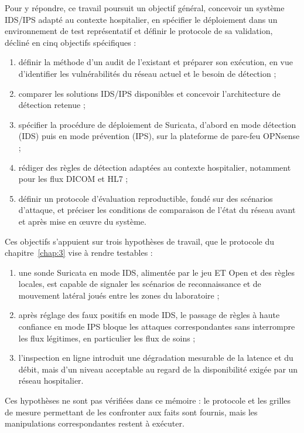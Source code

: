 Pour y répondre, ce travail poursuit un objectif général, concevoir un système IDS/IPS adapté au contexte hospitalier, en spécifier le déploiement dans un environnement de test représentatif et définir le protocole de sa validation, décliné en cinq objectifs spécifiques :
\begin{enumerate}
\item définir la méthode d'un audit de l'existant et préparer son exécution, en vue d'identifier les vulnérabilités du réseau actuel et le besoin de détection ;
\item comparer les solutions IDS/IPS disponibles et concevoir l'architecture de détection retenue ;
\item spécifier la procédure de déploiement de Suricata, d'abord en mode détection (IDS) puis en mode prévention (IPS), sur la plateforme de pare-feu OPNsense ;
\item rédiger des règles de détection adaptées au contexte hospitalier, notamment pour les flux DICOM et HL7 ;
\item définir un protocole d'évaluation reproductible, fondé sur des scénarios d'attaque, et préciser les conditions de comparaison de l'état du réseau avant et après mise en œuvre du système.
\end{enumerate}

Ces objectifs s'appuient sur trois hypothèses de travail, que le protocole du chapitre~\ref{chap:3} vise à rendre testables :
\begin{enumerate}
\item[\textbf{H1.}] une sonde Suricata en mode IDS, alimentée par le jeu ET Open et des règles locales, est capable de signaler les scénarios de reconnaissance et de mouvement latéral joués entre les zones du laboratoire ;
\item[\textbf{H2.}] après réglage des faux positifs en mode IDS, le passage de règles à haute confiance en mode IPS bloque les attaques correspondantes sans interrompre les flux légitimes, en particulier les flux de soins ;
\item[\textbf{H3.}] l'inspection en ligne introduit une dégradation mesurable de la latence et du débit, mais d'un niveau acceptable au regard de la disponibilité exigée par un réseau hospitalier.
\end{enumerate}
Ces hypothèses ne sont pas vérifiées dans ce mémoire : le protocole et les grilles de mesure permettant de les confronter aux faits sont fournis, mais les manipulations correspondantes restent à exécuter.

